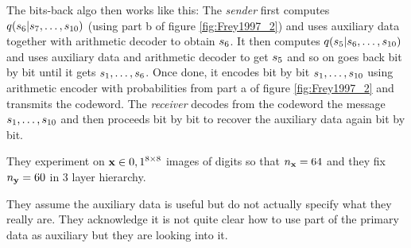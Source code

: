 The bits-back algo then works like this:
The \emph{sender} first computes $q({s}_6 | {s}_7, \ldots, {s}_{10})$ (using part b of figure \ref{fig:Frey1997_2}) and uses auxiliary data together with arithmetic decoder to obtain ${s}_6$.
It then computes $q({s}_5 | {s}_6, \ldots, {s}_{10})$ and uses auxiliary data and arithmetic decoder to get ${s}_5$ and so on goes back bit by bit until it gets ${s}_1, \ldots, {s}_6$.
Once done, it encodes bit by bit ${s}_1, \ldots, {s}_{10}$ using arithmetic encoder with probabilities from part a of figure \ref{fig:Frey1997_2} and transmits the codeword.
The \emph{receiver} decodes from the codeword the message ${s}_1, \ldots, {s}_{10}$ and then proceeds bit by bit to recover the auxiliary data again bit by bit.

They experiment on ${\mathbf{x}} \in {0,1}^{8 \times 8}$ images of digits so that $n_{{\mathbf{x}}} = 64$ and they fix $n_{{\mathbf{y}}} = 60$ in 3 layer hierarchy.

\begin{notebox}
They assume the auxiliary data is useful but do not actually specify what they really are. They acknowledge it is not quite clear how to use part of the primary data as auxiliary but they are looking into it.
\end{notebox}





